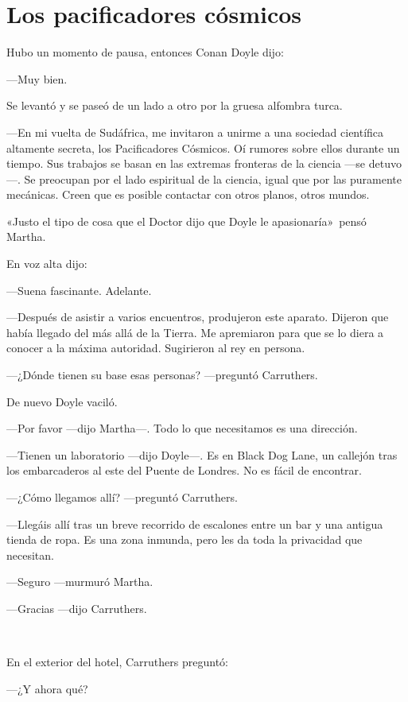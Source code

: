 \chapter*{Los pacificadores cósmicos}

Hubo un momento de pausa, entonces Conan Doyle dijo:

---Muy bien.

Se levantó y se paseó de un lado a otro por la gruesa alfombra turca.

---En mi vuelta de Sudáfrica, me invitaron a unirme a una sociedad
científica altamente secreta, los Pacificadores Cósmicos. Oí rumores
sobre ellos durante un tiempo. Sus trabajos se basan en las extremas
fronteras de la ciencia ---se detuvo---. Se preocupan por el lado
espiritual de la ciencia, igual que por las puramente mecánicas. Creen
que es posible contactar con otros planos, otros mundos.

«Justo el tipo de cosa que el Doctor dijo que Doyle le
apasionaría»~pensó Martha.

En voz alta dijo:

---Suena fascinante. Adelante.

---Después de asistir a varios encuentros, produjeron este aparato.
Dijeron que había llegado del más allá de la Tierra. Me apremiaron para
que se lo diera a conocer a la máxima autoridad. Sugirieron al rey en
persona.

---¿Dónde tienen su base esas personas? ---preguntó Carruthers.

De nuevo Doyle vaciló.

---Por favor ---dijo Martha---. Todo lo que necesitamos es una
dirección.

---Tienen un laboratorio ---dijo Doyle---. Es en Black Dog Lane, un
callejón tras los embarcaderos al este del Puente de Londres. No es
fácil de encontrar.

---¿Cómo llegamos allí? ---preguntó Carruthers.

---Llegáis allí tras un breve recorrido de escalones entre un bar y una
antigua tienda de ropa. Es una zona inmunda, pero les da toda la
privacidad que necesitan.

---Seguro ---murmuró Martha.

---Gracias ---dijo Carruthers.

~

En el exterior del hotel, Carruthers preguntó:

---¿Y ahora qué?

